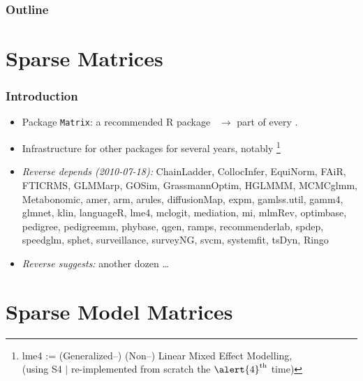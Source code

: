 

\begin{frame} \titlepage
\end{frame}
%
\begin{frame} \frametitle{Outline}
  \tableofcontents[hideallsubsections]
\end{frame}

\section{Sparse Matrices}\label{sec:intro}
\begin{frame}\frametitle{Introduction}
  \begin{itemize}
  \item Package \texttt{Matrix}: a \alert{recommended} R package \ $\to$
    part of every \Rp.%
  \item Infrastructure for other packages for several years,
    notably \footnote{
      \alert{lme4} := (Generalized--) (Non--) \alert{L}inear \alert{M}ixed
      \alert{E}ffect Modelling,
      \\ \qquad\qquad
      (using S\alert{4} $\mid$ re-implemented from scratch the
      $\alert{4}^\mathrm{th}$ time)}

  \item<2->\emph{Reverse depends (2010-07-18):} ChainLadder, CollocInfer,
    EquiNorm, FAiR, FTICRMS, GLMMarp, GOSim, GrassmannOptim, HGLMMM,
    MCMCglmm, Metabonomic, amer, arm, arules, diffusionMap, expm,
    gamlss.util, gamm4, \alert{glmnet}, klin, languageR, \alert{lme4}, mclogit,
    mediation, mi, mlmRev, optimbase, pedigree, pedigreemm, phybase,
    qgen, ramps, recommenderlab, spdep, \alert{speedglm}, sphet, surveillance,
    surveyNG, svcm, systemfit, tsDyn, Ringo

  \item<3-> \emph{Reverse suggests:} another dozen \dots
  \end{itemize}
\end{frame}



\section{Sparse {Model} Matrices}\label{sec:sparse-modmat}


